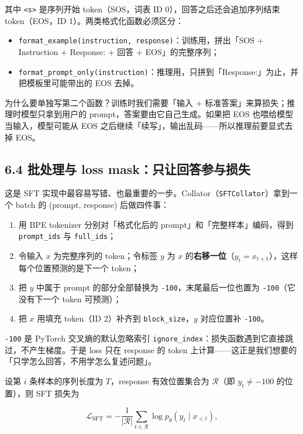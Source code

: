 其中 \texttt{<s>} 是序列开始 token（SOS，词表 ID 0），回答之后还会追加序列结束 token（EOS，ID 1）。两类格式化函数必须区分：

\begin{itemize}
\item \texttt{format\_example(instruction, response)}：训练用，拼出「SOS + Instruction + Response: + 回答 + EOS」的完整序列；
\item \texttt{format\_prompt\_only(instruction)}：推理用，只拼到「Response:」为止，并把模板里可能带出的 EOS 去掉。
\end{itemize}

为什么要单独写第二个函数？训练时我们需要「输入 + 标准答案」来算损失；推理时模型只拿到用户的 prompt，答案要由它自己生成。如果把 EOS 也喂给模型当输入，模型可能从 EOS 之后继续「续写」，输出乱码——所以推理前要显式去掉 EOS。

\subsection{6.4 批处理与 loss mask：只让回答参与损失}

这是 SFT 实现中最容易写错、也最重要的一步。Collator（\texttt{SFTCollator}）拿到一个 batch 的 (prompt, response) 后做四件事：

\begin{enumerate}
\item 用 BPE tokenizer 分别对「格式化后的 prompt」和「完整样本」编码，得到 \texttt{prompt\_ids} 与 \texttt{full\_ids}；
\item 令输入 $x$ 为完整序列的 token；令标签 $y$ 为 $x$ 的\textbf{右移一位}（$y_t = x_{t+1}$），这样每个位置预测的是下一个 token；
\item 把 $y$ 中属于 prompt 的部分全部替换为 \texttt{-100}，末尾最后一位也置为 \texttt{-100}（它没有下一个 token 可预测）；
\item 把 $x$ 用填充 token（ID 2）补齐到 \texttt{block\_size}，$y$ 对应位置补 \texttt{-100}。
\end{enumerate}

\texttt{-100} 是 PyTorch 交叉熵的默认忽略索引 \texttt{ignore\_index}：损失函数遇到它直接跳过，不产生梯度。于是 loss 只在 response 的 token 上计算——这正是我们想要的「只学怎么回答，不用学怎么复述问题」。

设第 $i$ 条样本的序列长度为 $T$，response 有效位置集合为 $\mathcal{R}$（即 $y_t \neq -100$ 的位置），则 SFT 损失为

$$
\mathcal{L}_{\text{SFT}} = -\frac{1}{|\mathcal{R}|}\sum_{t\in\mathcal{R}} \log p_\theta\!\left(y_t \mid x_{<t}\right),
$$

